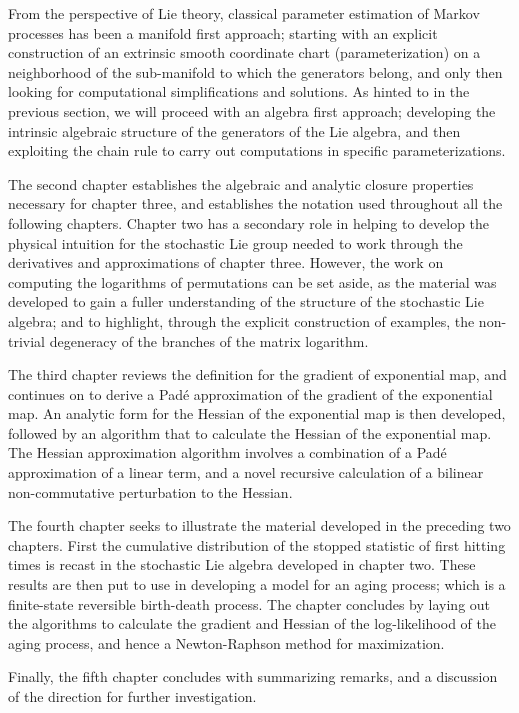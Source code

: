From the perspective of Lie theory, classical parameter estimation of Markov processes has
been a manifold first approach; starting with an explicit construction of an extrinsic
smooth coordinate chart (parameterization) on a neighborhood of the sub-manifold to which
the generators belong, and only then looking for computational simplifications and
solutions. As hinted to in the previous section, we will proceed with an algebra first
approach; developing the intrinsic algebraic structure of the generators of the Lie algebra,
and then exploiting the chain rule to carry out computations in specific parameterizations.

The second chapter establishes the algebraic and analytic closure properties necessary for 
chapter three, and establishes the notation used throughout all the following chapters.
Chapter two has a secondary role in helping to develop the physical intuition for the 
stochastic Lie group needed to work through the derivatives and approximations of chapter 
three. However, the work on computing the logarithms of permutations can be set aside, as 
the material was developed to gain a fuller understanding of the structure of the stochastic 
Lie algebra; and to highlight, through the explicit construction of examples, the
non-trivial degeneracy of the branches of the matrix logarithm.

The third chapter reviews the definition for the gradient of exponential map, and continues
on to derive a Pad\'{e} approximation of the gradient of the exponential map. An analytic
form for the Hessian of the exponential map is then developed, followed by an algorithm that
to calculate the Hessian of the exponential map. The Hessian approximation algorithm
involves a combination of a Pad\'{e} approximation of a linear term, and a novel recursive 
calculation of a bilinear non-commutative perturbation to the Hessian.

The fourth chapter seeks to illustrate the material developed in the preceding two chapters.
First the cumulative distribution of the stopped statistic of first hitting times is recast 
in the stochastic Lie algebra developed in chapter two. These results are then put to use in
developing a model for an aging process; which is a finite-state reversible birth-death
process. The chapter concludes by laying out the algorithms to calculate the gradient and
Hessian of the log-likelihood of the aging process, and hence a Newton-Raphson method for
maximization.

Finally, the fifth chapter concludes with summarizing remarks, and a discussion of the
direction for further investigation.